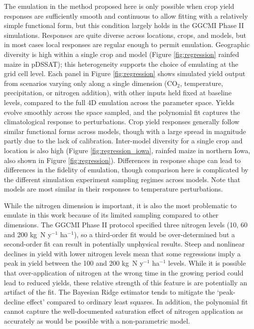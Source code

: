 \documentclass[gmd, manuscript]{copernicus} %
\begin{document}
The emulation in the method proposed here is only possible when crop yield responses are sufficiently smooth and continuous to allow fitting with a relatively simple functional form, but this condition largely holds in the GGCMI Phase II simulations. 
Responses are quite diverse across locations, crops, and models, but in most cases local responses are regular enough to permit emulation. 
Geographic diversity is high within a single crop and model (Figure \ref{fig:regression} rainfed maize in pDSSAT); this heterogeneity supports the choice of emulating at the grid cell level. 
Each panel in Figure \ref{fig:regression} shows simulated yield output from scenarios varying only along a single dimension (CO$_2$, temperature, precipitation, or nitrogen addition), with other inputs held fixed at baseline levels, compared to the full 4D emulation across the parameter space. 
Yields evolve smoothly across the space sampled, and the polynomial fit captures the climatological response to perturbations. 
Crop yield responses generally follow similar functional forms across models, though with a large spread in magnitude partly due to the lack of calibration. 
Inter-model diversity for a single crop and location is also high (Figure \ref{fig:regression_iowa}, rainfed maize in northern Iowa, also shown in Figure \ref{fig:regression}). 
Differences in response shape can lead to  differences in the fidelity of emulation, though comparison here is complicated by the different simulation experiment sampling regimes across models. 
Note that models are most similar in their responses to temperature perturbations. 

While the nitrogen dimension is important, it is also the most problematic to emulate in this work because of its limited sampling compared to other dimensions. 
The GGCMI Phase II protocol specified three nitrogen levels (10, 60 and 200 kg~N y$^{-1}$ ha$^{-1}$), so a third-order fit would be over-determined but a second-order fit can result in potentially unphysical results. 
Steep and nonlinear declines in yield with lower nitrogen levels mean that some regressions imply a peak in yield between the 100 and 200 kg~N y$^{-1}$ ha$^{-1}$ levels. 
While it is possible that over-application of nitrogen at the wrong time in the growing period could lead to reduced yields, these relative strength of this feature is are potentially an artifact of the fit. 
The Bayesian Ridge estimator tends to mitigate the `peak-decline effect' compared to ordinary least squares. 
In addition, the polynomial fit cannot capture the well-documented saturation effect of nitrogen application \citep[e.g.][]{Torsten77} as accurately as would be possible with a non-parametric model. 
\end{document}

